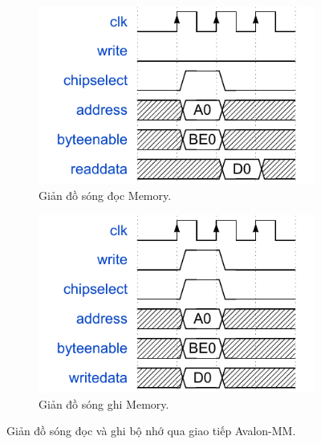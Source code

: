 \begin{figure}[htbp]
    \centerin
    \begin{subfigure}[b]{0.48\textwidth}
        \centering
        \includegraphics[width=\linewidth]{Images/02_07_Memory_ReadWaveform.pdf}
        \caption{Giản đồ sóng đọc Memory.}
        \label{fig:02_07_memory_read_sub}
    \end{subfigure}
    \hfill
    \begin{subfigure}[b]{0.48\textwidth}
        \centering
        \includegraphics[width=\linewidth]{Images/02_08_Memory_WriteWaveform.pdf}
        \caption{Giản đồ sóng ghi Memory.}
        \label{fig:02_08_memory_write_sub}
    \end{subfigure}
    \caption{Giản đồ sóng đọc và ghi bộ nhớ qua giao tiếp Avalon-MM.}
    \label{fig:memory_waveforms}
\end{figure}
